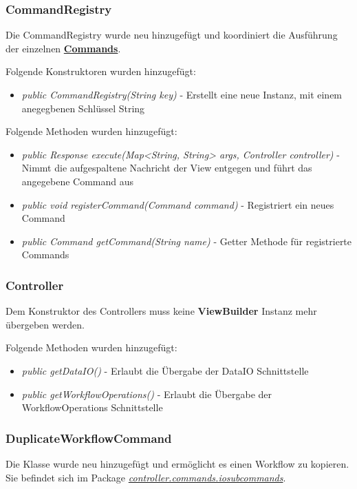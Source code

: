 \documentclass[parskip=full]{scrartcl}
\begin{document}
			\subsubsection{CommandRegistry}
				Die CommandRegistry wurde neu hinzugefügt und koordiniert die Ausführung der einzelnen \hyperlink{controller:commandSection}{\textbf{Commands}}.
				
				Folgende Konstruktoren wurden hinzugefügt:
				\begin{itemize}
					\item \textit{public CommandRegistry(String key)} - Erstellt eine neue Instanz, mit einem anegegbenen Schlüssel String					
				\end{itemize}
				
				Folgende Methoden wurden hinzugefügt:
				\begin{itemize}
					\item \textit{public Response execute(Map<String, String> args, Controller controller)} - Nimmt die aufgespaltene Nachricht der View entgegen und führt das angegebene Command aus
					\item \textit{public void registerCommand(Command command)} - Registriert ein neues Command
					\item \textit{public Command getCommand(String name)} - Getter Methode für registrierte Commands
				\end{itemize}
				
				
			\subsubsection{Controller}
				Dem Konstruktor des Controllers muss keine \textbf{ViewBuilder} Instanz mehr übergeben werden.
				
				Folgende Methoden wurden hinzugefügt:
				\begin{itemize}
					\item \textit{public getDataIO()} - Erlaubt die Übergabe der DataIO Schnittstelle
					\item \textit{public getWorkflowOperations()} - Erlaubt die Übergabe der WorkflowOperations Schnittstelle 	
				\end{itemize}
			
			\subsubsection{DuplicateWorkflowCommand}
				Die Klasse wurde neu hinzugefügt und ermöglicht es einen Workflow zu kopieren.
				Sie befindet sich im Package \hyperlink{controller:controller.commands.iosubcommands}{\textit{controller.commands.iosubcommands}}.
				
\end{document}
